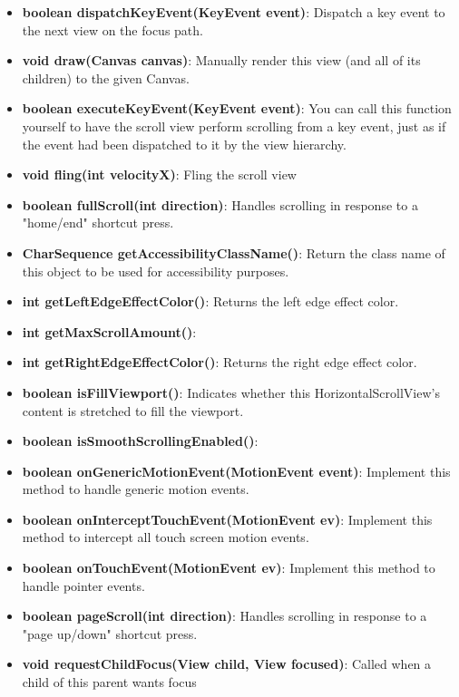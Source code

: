 \documentclass{report}
\begin{document}
\begin{itemize}
\begin{itemize}
\begin{itemize}
                \item \textbf{boolean	dispatchKeyEvent(KeyEvent event)}: Dispatch a key event to the next view on the focus path.
                \item \textbf{void	draw(Canvas canvas)}: Manually render this view (and all of its children) to the given Canvas.
                \item \textbf{boolean	executeKeyEvent(KeyEvent event)}: You can call this function yourself to have the scroll view perform scrolling from a key event, just as if the event had been dispatched to it by the view hierarchy.
                \item \textbf{void	fling(int velocityX)}: Fling the scroll view
                \item \textbf{boolean	fullScroll(int direction)}: Handles scrolling in response to a "home/end" shortcut press.
                \item \textbf{CharSequence	getAccessibilityClassName()}: Return the class name of this object to be used for accessibility purposes.
                \item \textbf{int	getLeftEdgeEffectColor()}: Returns the left edge effect color.
                \item \textbf{int	getMaxScrollAmount()}:
                \item \textbf{int	getRightEdgeEffectColor()}: Returns the right edge effect color.
                \item \textbf{boolean	isFillViewport()}: Indicates whether this HorizontalScrollView's content is stretched to fill the viewport.
                \item \textbf{boolean	isSmoothScrollingEnabled()}:
                \item \textbf{boolean	onGenericMotionEvent(MotionEvent event)}: Implement this method to handle generic motion events.
                \item \textbf{boolean	onInterceptTouchEvent(MotionEvent ev)}: Implement this method to intercept all touch screen motion events.
                \item \textbf{boolean	onTouchEvent(MotionEvent ev)}: Implement this method to handle pointer events.
                \item \textbf{boolean	pageScroll(int direction)}: Handles scrolling in response to a "page up/down" shortcut press.
                \item \textbf{void	requestChildFocus(View child, View focused)}: Called when a child of this parent wants focus

\end{itemize}
\end{itemize}
\end{itemize}
\end{document}
